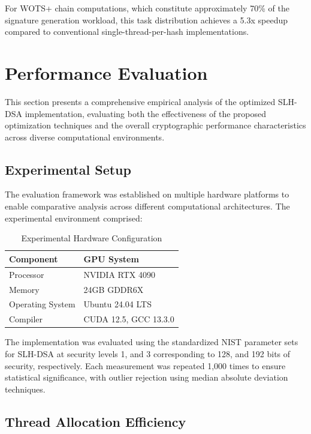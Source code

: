 \documentclass[journal]{IEEEtran}
\begin{document}
For WOTS+ chain computations, which constitute approximately 70\% of the signature generation workload, this task distribution achieves a 5.3x speedup compared to conventional single-thread-per-hash implementations.

\section{Performance Evaluation}\label{sec:evaluation}

This section presents a comprehensive empirical analysis of the optimized SLH-DSA implementation, evaluating both the effectiveness of the proposed optimization techniques and the overall cryptographic performance characteristics across diverse computational environments.

\subsection{Experimental Setup}

The evaluation framework was established on multiple hardware platforms to enable comparative analysis across different computational architectures. The experimental environment comprised:

\begin{table}[h]
  \centering
  \caption{Experimental Hardware Configuration}
  \label{tab:hardware_config}
  \begin{tabular}{@{}ll@{}}
    \toprule
    \textbf{Component} & \textbf{GPU System} \\
    \midrule
    Processor & NVIDIA RTX 4090 \\
    Memory & 24GB GDDR6X \\
    Operating System & Ubuntu 24.04 LTS \\
    Compiler & CUDA 12.5, GCC 13.3.0 \\
    \bottomrule
  \end{tabular}
\end{table}

The implementation was evaluated using the standardized NIST parameter sets for SLH-DSA at security levels 1, and 3 corresponding to 128, and 192 bits of security, respectively. Each measurement was repeated 1,000 times to ensure statistical significance, with outlier rejection using median absolute deviation techniques.

\subsection{Thread Allocation Efficiency}
\end{document}
